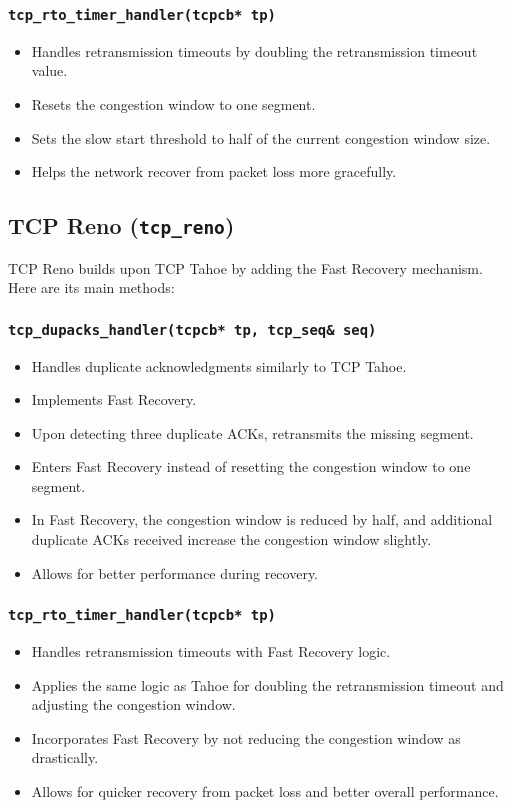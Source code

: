 \subsubsection{\texttt{\large tcp\_rto\_timer\_handler(tcpcb* tp)}}
\begin{itemize}
    \item Handles retransmission timeouts by doubling the retransmission timeout value.
    \item Resets the congestion window to one segment.
    \item Sets the slow start threshold to half of the current congestion window size.
    \item Helps the network recover from packet loss more gracefully.
\end{itemize}

\subsection{TCP Reno (\texttt{tcp\_reno})}
TCP Reno builds upon TCP Tahoe by adding the Fast Recovery mechanism. Here are its main methods:

\subsubsection{\texttt{\large tcp\_dupacks\_handler(tcpcb* tp, tcp\_seq\& seq)}}
\begin{itemize}
    \item Handles duplicate acknowledgments similarly to TCP Tahoe.
    \item Implements Fast Recovery.
    \item Upon detecting three duplicate ACKs, retransmits the missing segment.
    \item Enters Fast Recovery instead of resetting the congestion window to one segment.
    \item In Fast Recovery, the congestion window is reduced by half, and additional duplicate ACKs received increase the congestion window slightly.
    \item Allows for better performance during recovery.
\end{itemize}

\subsubsection{\texttt{\large tcp\_rto\_timer\_handler(tcpcb* tp)}}
\begin{itemize}
    \item Handles retransmission timeouts with Fast Recovery logic.
    \item Applies the same logic as Tahoe for doubling the retransmission timeout and adjusting the congestion window.
    \item Incorporates Fast Recovery by not reducing the congestion window as drastically.
    \item Allows for quicker recovery from packet loss and better overall performance.
\end{itemize}